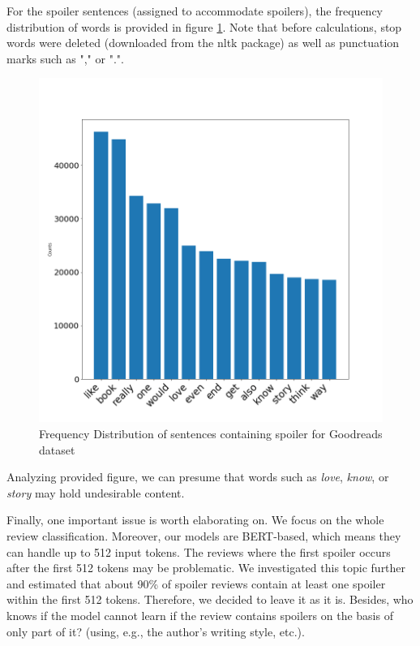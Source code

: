 \documentclass[11pt]{article}
\begin{document}
For the spoiler sentences (assigned to accommodate spoilers), the frequency distribution of words is provided in figure \ref{fig:freq-dist}. Note that before calculations, stop words were deleted (downloaded from the nltk package) as well as punctuation marks such as "," or ".".

\begin{figure}
    \centering
    \includegraphics[width=\columnwidth]{img/FreqDistFiqure.png}
    \caption{Frequency Distribution of sentences containing spoiler for Goodreads dataset}
    \label{fig:freq-dist}
\end{figure}

Analyzing provided figure, we can presume that words such as \emph{love}, \emph{know}, or \emph{story} may hold undesirable content.

Finally, one important issue is worth elaborating on. We focus on the whole review classification. Moreover, our models are BERT-based, which means they can handle up to 512 input tokens. The reviews where the first spoiler occurs after the first 512 tokens may be problematic. We investigated this topic further and estimated that about 90\% of spoiler reviews contain at least one spoiler within the first 512 tokens. Therefore, we decided to leave it as it is. Besides, who knows if the model cannot learn if the review contains spoilers on the basis of only part of it? (using, e.g., the author's writing style, etc.).
\end{document}
